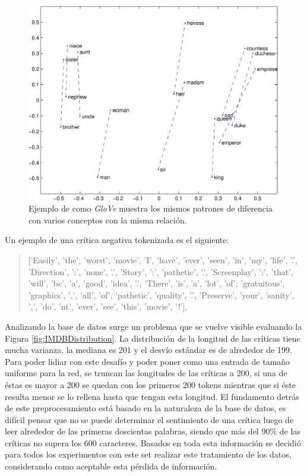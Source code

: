 \documentclass[spanish]{article}
\theoremstyle{definition}
\theoremstyle{remark}
\numberwithin{equation}{section}
\numberwithin{equation}{section} %
\begin{document}
\par
\begin{figure}[H]
\centering
\includegraphics[width=14cm]{img/glove_viz.jpg}
\caption[GloVe]{\footnotesize{  Ejemplo de como \textit{GloVe} \cite{pennington2014glove} muestra los mismos patrones de diferencia con varios conceptos con la misma relación. }}
\label{fig:GloVe}
\end{figure}
\par
Un ejemplo de una crítica negativa tokenizada es el siguiente:  
\blockquote{['Easily', 'the', 'worst', 'movie', 'I', 'have', 'ever', 'seen', 'in', 'my', 'life', '.', 'Direction', ':', 'none', '.', 'Story', ':', 'pathetic', '.', 'Screenplay', ':', 'that', 'will', 'be', 'a', 'good', 'idea', '.', 'There', 'is', 'a', 'lot', 'of', 'gratuitous', 'graphics', ',', 'all', 'of', 'pathetic', 'quality', '.', 'Preserve', 'your', 'sanity', ',', 'do', 'nt', 'ever', 'see', 'this', 'movie', '!'],}
Analizando la base de datos surge un problema que se vuelve visible evaluando la Figura \ref{fig:IMDBDistribution}. La distribución de la longitud de las críticas tiene mucha varianza, la mediana es 201 y el desvío estándar es de alrededor de 199. Para poder lidiar con este desafío y poder poner como una entrada de tamaño uniforme para la red, se truncan las longitudes de las críticas a 200, si una de éstas es mayor a 200 se quedan con los primeros 200 tokens mientras que si éste resulta menor se lo rellena hasta que tengan esta longitud. El fundamento detrás de este preprocesamiento está basado en la naturaleza de la base de datos, es difícil pensar que no se puede determinar el sentimiento de una crítica luego de leer alrededor de las primeras doscientas palabras, siendo que más del 90\% de las críticas no supera los 600 caracteres. Basados en toda esta información se decidió para todos los experimentos con este set realizar este tratamiento de los datos, considerando como aceptable esta pérdida de información.  
\end{document}
